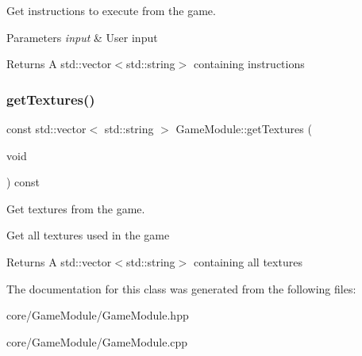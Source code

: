 Get instructions to execute from the game. 


\begin{DoxyParams}{Parameters}
{\em input} & User input \\
\hline
\end{DoxyParams}
\begin{DoxyReturn}{Returns}
A std\+::vector$<$std\+::string$>$ containing instructions 
\end{DoxyReturn}
\mbox{\label{class_game_module_a54c7d41e2ddf42b1c46846f2653ad746}} 
\subsubsection{\texorpdfstring{get\+Textures()}{getTextures()}}
{\footnotesize\ttfamily const std\+::vector$<$ std\+::string $>$ Game\+Module\+::get\+Textures (\begin{DoxyParamCaption}\item[{void}]{ }\end{DoxyParamCaption}) const}



Get textures from the game. 

Get all textures used in the game

\begin{DoxyReturn}{Returns}
A std\+::vector$<$std\+::string$>$ containing all textures 
\end{DoxyReturn}


The documentation for this class was generated from the following files\+:\begin{DoxyCompactItemize}
\item 
core/\+Game\+Module/Game\+Module.\+hpp\item 
core/\+Game\+Module/Game\+Module.\+cpp\end{DoxyCompactItemize}

